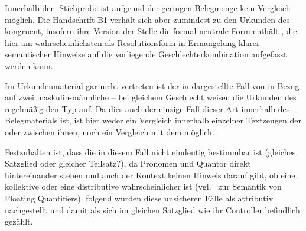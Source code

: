 Innerhalb der \KC{}-Stichprobe ist aufgrund der geringen Belegmenge kein
Vergleich möglich. Die Handschrift B1 verhält sich aber zumindest zu den
Urkunden des \CAO{} kongruent, insofern ihre Version der Stelle die
formal neutrale Form  enthält
, die hier am wahrscheinlichsten als Resolutionsform in
Ermangelung klarer semantischer Hinweise auf die vorliegende
Geschlechterkombination aufgefasst werden kann.

Im Urkundenmaterial gar nicht vertreten ist der in 
dargestellte Fall von  in Bezug auf zwei maskulin-männliche
 -- bei gleichem Geschlecht weisen die Urkunden des
\CAO{} regelmäßig den Typ  auf. Da dies auch der einzige Fall
dieser Art innerhalb des \KC{}-Belegmaterials ist, ist hier weder ein Vergleich
innerhalb einzelner Textzeugen der \KC{} oder zwischen ihnen, noch ein
Vergleich mit dem \CAO{} möglich.

\begin{exe}
\end{exe}

Festzuhalten ist, dass die  in diesem Fall nicht
eindeutig bestimmbar ist (gleiches Satzglied oder gleicher
Teilsatz?), da Pronomen und Quantor direkt hintereinander stehen und auch der
Kontext keinen Hinweis darauf gibt, ob eine kollektive oder eine distributive
 wahrscheinlicher ist (vgl.~ zur Semantik
von Floating Quantifiers). \citet[623]{ksw2} folgend
wurden diese unsicheren Fälle als attributiv nachgestellt und
damit als sich im gleichen Satzglied wie ihr Controller befindlich gezählt.

